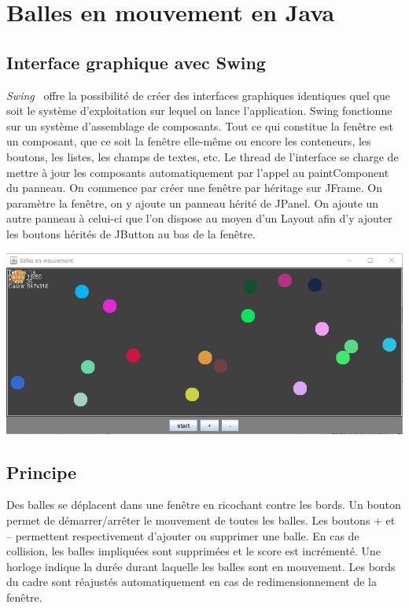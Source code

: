 \documentclass{article}
\begin{document}
\section{Balles en mouvement en Java}
\subsection{Interface graphique avec Swing}

\textit{Swing}~\cite{refSwing} offre la possibilité de créer des interfaces graphiques identiques quel que soit le système d’exploitation sur lequel on lance l’application.
\medbreak
Swing fonctionne sur un système d’assemblage de composants. Tout ce qui constitue la fenêtre est un composant, que ce soit la fenêtre elle-même ou encore les conteneurs, les boutons, les listes, les champs de textes, etc. Le thread de l’interface se charge de mettre à jour les composants automatiquement par l’appel au paintComponent du panneau.
\medbreak
On commence par créer une fenêtre par héritage sur JFrame. On paramètre la fenêtre, on y ajoute un panneau hérité de JPanel. On ajoute un autre panneau à celui-ci que l’on dispose au moyen d’un Layout afin d’y ajouter les boutons hérités de JButton au bas de la fenêtre.

\bigbreak
\begin{center}
  \includegraphics[scale=0.66]{Balles_en_mouvement.png}
\end{center}
\bigbreak

\subsection{Principe}

Des balles se déplacent dans une fenêtre en ricochant contre les bords. Un bouton permet de démarrer/arrêter le mouvement de toutes les balles. Les boutons + et – permettent respectivement d’ajouter ou supprimer une balle. En cas de collision, les balles impliquées sont supprimées et le score est incrémenté. Une horloge indique la durée durant laquelle les balles sont en mouvement. Les bords du cadre sont réajustés automatiquement en cas de redimensionnement de la fenêtre.
\end{document}
